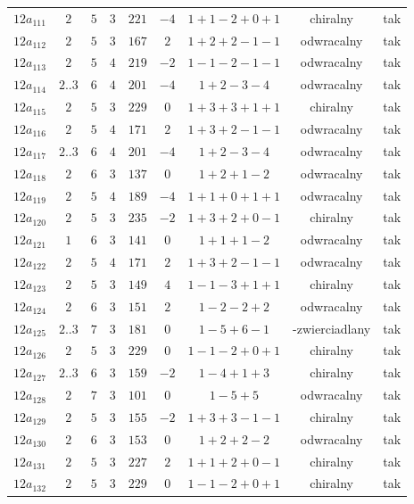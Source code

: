 \begin{longtable}{ccccccccc}
$12a_{111}$ & $2$ & $5$ & $3$ & $221$ & $-4$ & $1+1-2+0+1$ & chiralny & tak \\
$12a_{112}$ & $2$ & $5$ & $3$ & $167$ & $2$ & $1+2+2-1-1$ & odwracalny & tak \\
$12a_{113}$ & $2$ & $5$ & $4$ & $219$ & $-2$ & $1-1-2-1-1$ & odwracalny & tak \\
$12a_{114}$ & $2..3$ & $6$ & $4$ & $201$ & $-4$ & $1+2-3-4$ & odwracalny & tak \\
$12a_{115}$ & $2$ & $5$ & $3$ & $229$ & $0$ & $1+3+3+1+1$ & chiralny & tak \\
$12a_{116}$ & $2$ & $5$ & $4$ & $171$ & $2$ & $1+3+2-1-1$ & odwracalny & tak \\
$12a_{117}$ & $2..3$ & $6$ & $4$ & $201$ & $-4$ & $1+2-3-4$ & odwracalny & tak \\
$12a_{118}$ & $2$ & $6$ & $3$ & $137$ & $0$ & $1+2+1-2$ & odwracalny & tak \\
$12a_{119}$ & $2$ & $5$ & $4$ & $189$ & $-4$ & $1+1+0+1+1$ & odwracalny & tak \\
$12a_{120}$ & $2$ & $5$ & $3$ & $235$ & $-2$ & $1+3+2+0-1$ & chiralny & tak \\
$12a_{121}$ & $1$ & $6$ & $3$ & $141$ & $0$ & $1+1+1-2$ & odwracalny & tak \\
$12a_{122}$ & $2$ & $5$ & $4$ & $171$ & $2$ & $1+3+2-1-1$ & odwracalny & tak \\
$12a_{123}$ & $2$ & $5$ & $3$ & $149$ & $4$ & $1-1-3+1+1$ & chiralny & tak \\
$12a_{124}$ & $2$ & $6$ & $3$ & $151$ & $2$ & $1-2-2+2$ & odwracalny & tak \\
$12a_{125}$ & $2..3$ & $7$ & $3$ & $181$ & $0$ & $1-5+6-1$ & -zwierciadlany & tak \\
$12a_{126}$ & $2$ & $5$ & $3$ & $229$ & $0$ & $1-1-2+0+1$ & chiralny & tak \\
$12a_{127}$ & $2..3$ & $6$ & $3$ & $159$ & $-2$ & $1-4+1+3$ & chiralny & tak \\
$12a_{128}$ & $2$ & $7$ & $3$ & $101$ & $0$ & $1-5+5$ & odwracalny & tak \\
$12a_{129}$ & $2$ & $5$ & $3$ & $155$ & $-2$ & $1+3+3-1-1$ & chiralny & tak \\
$12a_{130}$ & $2$ & $6$ & $3$ & $153$ & $0$ & $1+2+2-2$ & odwracalny & tak \\
$12a_{131}$ & $2$ & $5$ & $3$ & $227$ & $2$ & $1+1+2+0-1$ & chiralny & tak \\
$12a_{132}$ & $2$ & $5$ & $3$ & $229$ & $0$ & $1-1-2+0+1$ & chiralny & tak \\

\end{longtable}
